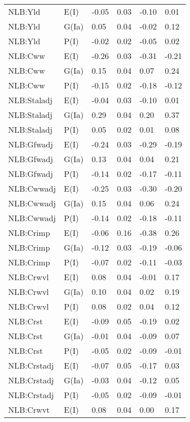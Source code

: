 \begin{center}
\begin{longtable}{|p{1.1in}|p{0.7in}|p{0.7in}|p{0.6in}|p{0.6in}|p{0.6in}|}
  NLB:Yld & E(I) & -0.05 & 0.03 & -0.10 & 0.01 \\ 
  NLB:Yld & G(Ia) & 0.05 & 0.04 & -0.02 & 0.12 \\ 
  NLB:Yld & P(I) & -0.02 & 0.02 & -0.05 & 0.02 \\ 
  NLB:Cww & E(I) & -0.26 & 0.03 & -0.31 & -0.21 \\ 
  NLB:Cww & G(Ia) & 0.15 & 0.04 & 0.07 & 0.24 \\ 
  NLB:Cww & P(I) & -0.15 & 0.02 & -0.18 & -0.12 \\ 
  NLB:Staladj & E(I) & -0.04 & 0.03 & -0.10 & 0.01 \\ 
  NLB:Staladj & G(Ia) & 0.29 & 0.04 & 0.20 & 0.37 \\ 
  NLB:Staladj & P(I) & 0.05 & 0.02 & 0.01 & 0.08 \\ 
  NLB:Gfwadj & E(I) & -0.24 & 0.03 & -0.29 & -0.19 \\ 
  NLB:Gfwadj & G(Ia) & 0.13 & 0.04 & 0.04 & 0.21 \\ 
  NLB:Gfwadj & P(I) & -0.14 & 0.02 & -0.17 & -0.11 \\ 
  NLB:Cwwadj & E(I) & -0.25 & 0.03 & -0.30 & -0.20 \\ 
  NLB:Cwwadj & G(Ia) & 0.15 & 0.04 & 0.06 & 0.24 \\ 
  NLB:Cwwadj & P(I) & -0.14 & 0.02 & -0.18 & -0.11 \\ 
  NLB:Crimp & E(I) & -0.06 & 0.16 & -0.38 & 0.26 \\ 
  NLB:Crimp & G(Ia) & -0.12 & 0.03 & -0.19 & -0.06 \\ 
  NLB:Crimp & P(I) & -0.07 & 0.02 & -0.11 & -0.03 \\ 
  NLB:Crwvl & E(I) & 0.08 & 0.04 & -0.01 & 0.17 \\ 
  NLB:Crwvl & G(Ia) & 0.10 & 0.04 & 0.02 & 0.19 \\ 
  NLB:Crwvl & P(I) & 0.08 & 0.02 & 0.04 & 0.12 \\ 
  NLB:Crst & E(I) & -0.09 & 0.05 & -0.19 & 0.02 \\ 
  NLB:Crst & G(Ia) & -0.01 & 0.04 & -0.09 & 0.07 \\ 
  NLB:Crst & P(I) & -0.05 & 0.02 & -0.09 & -0.01 \\ 
  NLB:Crstadj & E(I) & -0.07 & 0.05 & -0.17 & 0.03 \\ 
  NLB:Crstadj & G(Ia) & -0.03 & 0.04 & -0.12 & 0.05 \\ 
  NLB:Crstadj & P(I) & -0.05 & 0.02 & -0.09 & -0.01 \\ 
  NLB:Crwvt & E(I) & 0.08 & 0.04 & 0.00 & 0.17 \\ 

\end{longtable}
\end{center}
